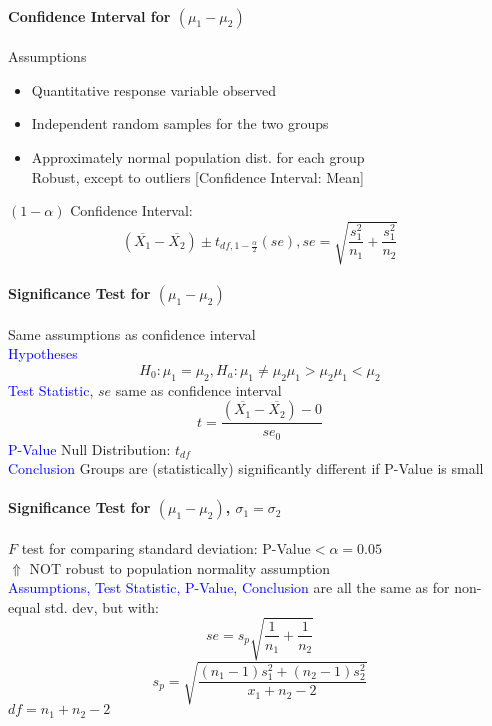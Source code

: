 \paragraph{Confidence Interval for $(\mu_1-\mu_2)$}
\textcolor{Bittersweet}{Assumptions}
\begin{itemize}
	\item Quantitative response variable observed 
	\item Independent random samples for the two groups
	\item Approximately normal population dist. for each group\\
		Robust, except to outliers [Confidence Interval: Mean]
\end{itemize}
$(1-\alpha)$ Confidence Interval:
\[(\overline{X_1}-\overline{X_2})\pm t_{df,1-\frac{\alpha}{2}}(se),se=\sqrt{\frac{s_1^2}{n_1}+\frac{s_1^2}{n_2}}\]
\paragraph{Significance Test for $(\mu_1-\mu_2)$}
Same \textcolor{Bittersweet}{assumptions} as confidence interval\\
\textcolor{Blue}{Hypotheses}
\[H_0\colon \mu_1=\mu_2,H_a:\mu_1\neq \mu_2\mu_1>\mu_2\mu_1<\mu_2\]
\textcolor{Blue}{Test Statistic}, $se$ same as confidence interval
\[t=\frac{(\overline{X_1}-\overline{X_2})-0}{se_0}\]
\textcolor{Blue}{P-Value} Null Distribution: $t_{df}$\\
\textcolor{Blue}{Conclusion}
Groups are (statistically) significantly different if P-Value is small
\paragraph{Significance Test for $(\mu_1-\mu_2)$, $\sigma_1=\sigma_2$}
$F$ test for comparing standard deviation: P-Value$<\alpha=0.05$\\
$\Uparrow$ NOT robust to population normality assumption\\
\textcolor{Blue}{Assumptions, Test Statistic, P-Value, Conclusion} are all the
same as for non-equal std. dev, but with:
\[se=s_p\sqrt{\frac{1}{n_1}+\frac{1}{n_2}}\]
\[s_p=\sqrt{\frac{(n_1-1)s_1^2+(n_2-1)s_2^2}{x_1+n_2-2}}\]
$df=n_1+n_2-2$